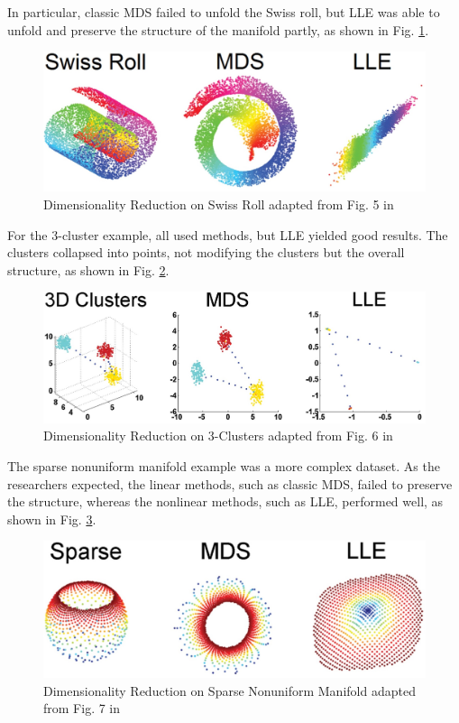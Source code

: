 In particular, classic MDS failed to unfold the Swiss roll, but LLE was able to unfold and preserve the structure of the manifold partly, as shown in Fig. \ref{fig:swiss_roll_related_work}.
\begin{figure}[!]
	\centering
	\includegraphics[width=\columnwidth-0.4cm]{images/swiss_roll_related_work.jpg}
	\caption[Dimensionality Reduction on Swiss Roll]{Dimensionality Reduction on Swiss Roll adapted from Fig. 5 in \cite{Akhbardeh12}}
    \label{fig:swiss_roll_related_work}
\end{figure}
For the 3-cluster example, all used methods, but LLE yielded good results. The clusters collapsed into points, not modifying the clusters but the overall structure, as shown in Fig. \ref{fig:3-cluster_related_work}.
\begin{figure}[!]
	\centering
	\includegraphics[width=\columnwidth-0.4cm]{images/3-cluster_related_work.jpg}
	\caption[Dimensionality Reduction on 3-Clusters]{Dimensionality Reduction on 3-Clusters adapted from Fig. 6 in \cite{Akhbardeh12}}
    \label{fig:3-cluster_related_work}
\end{figure}
The sparse nonuniform manifold example was a more complex dataset. As the researchers expected, the linear methods, such as classic MDS, failed to preserve the structure, whereas the nonlinear methods, such as LLE, performed well, as shown in Fig. \ref{fig:sparse_related_work}.
\begin{figure}[!]
	\centering
	\includegraphics[width=\columnwidth-0.4cm]{images/sparse_related_work.jpg}
	\caption[Dimensionality Reduction on Sparse Nonuniform Manifold]{Dimensionality Reduction on Sparse Nonuniform Manifold adapted from Fig. 7 in \cite{Akhbardeh12}}
    \label{fig:sparse_related_work}
\end{figure}

